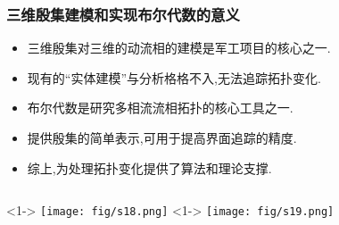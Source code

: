 \documentclass[UTF8]{ctexbeamer}	%
\theoremstyle{plain}
\theoremstyle{definition}
\theoremstyle{remark}
\numberwithin{equation}{section}
\begin{document}
\begin{frame}
    \frametitle{三维殷集建模和实现布尔代数的意义}
    \begin{itemize}
        \item 三维殷集对三维的动流相的建模是军工项目的核心之一.
        \item 现有的``实体建模''与分析格格不入,无法追踪拓扑变化.
        \item 布尔代数是研究多相流流相拓扑的核心工具之一.
        \item 提供殷集的简单表示,可用于提高界面追踪的精度.
        \item 综上,为处理拓扑变化提供了算法和理论支撑.
    \end{itemize}

    \begin{columns}
        <1->
        \centering
        \texttt{[image: fig/s18.png]}
        <1->
        \centering
        \texttt{[image: fig/s19.png]}
    \end{columns}

\end{frame}
\end{document}
